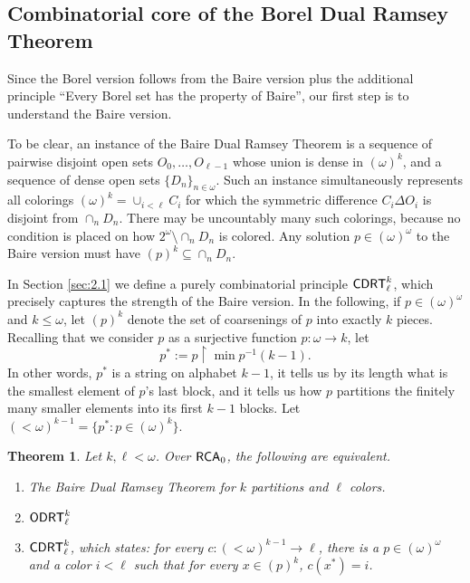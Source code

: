 \documentclass{amsart}
\newtheorem{thm}{Theorem}[section]
\theoremstyle{definition}
\theoremstyle{remark}
\newcommand{\system}[1]{\mbox{\fontfamily{cmss}\fontshape{n}\fontseries{m}%
    \selectfont#1}}
\newcommand{\RCA}{\system{RCA}\ensuremath{_0}}
\newcommand{\CDRT}{\system{CDRT}}
\newcommand{\ODRT}{\system{ODRT}}
\newcommand{\restrict}{\upharpoonright}
\begin{document}
\subsection{Combinatorial core of the Borel Dual Ramsey Theorem}

Since the Borel version follows from the Baire version plus the additional
principle ``Every Borel set has the property of Baire'', our first step is to understand
the Baire version. 
 
To be clear, an instance of the Baire Dual Ramsey Theorem is 
a sequence of pairwise
disjoint open sets $O_0,\dots,O_{\ell-1}$ whose union is dense
 in $(\omega)^k$,
and a sequence of dense open sets $\{D_n\}_{n\in\omega}$.
Such an instance simultaneously represents all colorings 
\mbox{$(\omega)^k = \cup_{i<\ell} C_i$}
for which the symmetric difference
$C_i \Delta O_i$ is disjoint from $\cap_n D_n$.  
There may be uncountably many such colorings,
because no condition is placed on how $2^\omega \setminus \cap_n D_n$
 is colored.  Any solution $p \in (\omega)^\omega$ to the Baire version must have 
$(p)^k \subseteq \cap_n D_n$.

In Section \ref{sec:2.1} 
we define a purely combinatorial principle $\CDRT^k_\ell$, which
precisely captures the strength of the Baire version.  In the following,
if $p \in (\omega)^\omega$ and $k\leq \omega$, let $(p)^k$ denote the
set of coarsenings of $p$ into exactly $k$ pieces.  Recalling that we 
consider $p$ as a surjective function $p:\omega\rightarrow k$, let 
$$p^\ast := p \restrict \min p^{-1}(k-1).$$
In other words, $p^\ast$ is a string on alphabet $k-1$,
it tells us by its length what is the smallest element 
 of $p$'s last block, and it tells us how $p$ partitions the finitely many smaller elements
 into its first $k-1$ blocks. 
 Let $(<\omega)^{k-1} = \{p^\ast : p \in (\omega)^k\}$.

\begin{thm}\label{thm:BaireOC} Let $k,\ell < \omega$.  Over $\RCA$, the following are equivalent.
\begin{enumerate}
\item The Baire Dual Ramsey Theorem for $k$ partitions and $\ell$ colors.
\item $\ODRT^k_\ell$
\item $\CDRT^k_\ell$, which states: for every $c : (<\omega)^{k-1} \rightarrow \ell$, 
there is a $p\in(\omega)^\omega$ and a color $i<\ell$ 
such that for every $x \in (p)^{k}$, $c(x^\ast) = i$.
\end{enumerate}
\end{thm}
\end{document}
